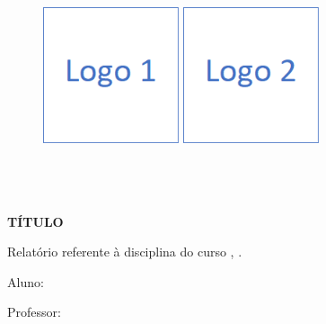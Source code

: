 \begin{titlepage}
	
	\begin{center}
	
		\begin{figure}[!ht]
			
		\centering
		\includegraphics[width=4cm]{figuras/logo_1.png} \hspace{2cm}
		\includegraphics[width=4cm]{figuras/logo_2.png}
		
		\end{figure}

		\Huge{\collegename}\\
		\large{\institutename}\\ 
		\large{\course}\\ 
		\vspace{1.5cm}
		\textbf{\LARGE{TÍTULO}}\\
		\vspace{1.5cm}
		
	\end{center}
	
	\begin{flushright}

	   \begin{list}{}{
	      \setlength{\leftmargin}{4.5cm}
	      \setlength{\rightmargin}{0cm}
	      \setlength{\labelwidth}{0pt}
	      \setlength{\labelsep}{\leftmargin}}
      
	      \item Relatório referente à disciplina \subjectname do curso \course, \collegename.
	      \item Aluno: \authorname
	      \item Professor: \professorname
	      
	   \end{list}
   
	\end{flushright}

\end{titlepage}

